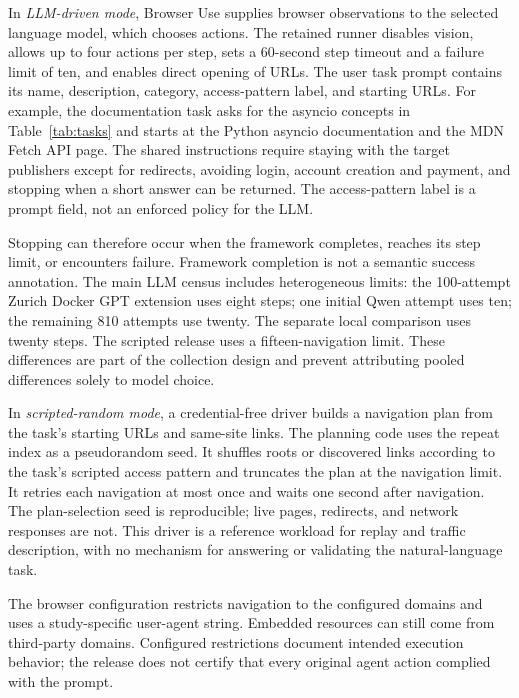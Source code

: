 \documentclass[10pt,sigconf,nonacm]{acmart}
\begin{document}
In \emph{LLM-driven mode}, Browser Use supplies browser observations to the selected language model, which chooses actions. The retained runner disables vision, allows up to four actions per step, sets a 60-second step timeout and a failure limit of ten, and enables direct opening of URLs. The user task prompt contains its name, description, category, access-pattern label, and starting URLs. For example, the documentation task asks for the asyncio concepts in Table~\ref{tab:tasks} and starts at the Python asyncio documentation and the MDN Fetch API page. The shared instructions require staying with the target publishers except for redirects, avoiding login, account creation and payment, and stopping when a short answer can be returned. The access-pattern label is a prompt field, not an enforced policy for the LLM.

Stopping can therefore occur when the framework completes, reaches its step limit, or encounters failure. Framework completion is not a semantic success annotation. The main LLM census includes heterogeneous limits: the 100-attempt Zurich Docker GPT extension uses eight steps; one initial Qwen attempt uses ten; the remaining 810 attempts use twenty. The separate local comparison uses twenty steps. The scripted release uses a fifteen-navigation limit. These differences are part of the collection design and prevent attributing pooled differences solely to model choice.

In \emph{scripted-random mode}, a credential-free driver builds a navigation plan from the task's starting URLs and same-site links. The planning code uses the repeat index as a pseudorandom seed. It shuffles roots or discovered links according to the task's scripted access pattern and truncates the plan at the navigation limit. It retries each navigation at most once and waits one second after navigation. The plan-selection seed is reproducible; live pages, redirects, and network responses are not. This driver is a reference workload for replay and traffic description, with no mechanism for answering or validating the natural-language task.

The browser configuration restricts navigation to the configured domains and uses a study-specific user-agent string. Embedded resources can still come from third-party domains. Configured restrictions document intended execution behavior; the release does not certify that every original agent action complied with the prompt.
\end{document}
